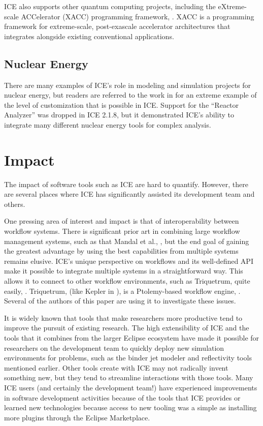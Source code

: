 ICE also supports other quantum computing projects, including the
eXtreme-scale ACCelerator (XACC) programming framework,
\cite{mccaskey_ornl-qci/xacc_2016}. XACC is a programming framework for
extreme-scale, post-exascale accelerator architectures that integrates
alongside existing conventional applications.

\subsection{Nuclear Energy}\label{nuclear-energy}

There are many examples of ICE's role in modeling and simulation
projects for nuclear energy, but readers are referred to the work in
\cite{billings_domain-specific_2015} for an extreme example of the level of
customization that is possible in ICE. Support for the ``Reactor
Analyzer'' was dropped in ICE 2.1.8, but it demonstrated ICE's ability
to integrate many different nuclear energy tools for complex analysis.

\section{Impact}\label{impact}

The impact of software tools such as ICE are hard to quantify. However,
there are several places where ICE has significantly assisted its
development team and others.

One pressing area of interest and impact is that of interoperability
between workflow systems. There is significant prior art in combining
large workflow management systems, such as that Mandal et al.,
\cite{mandal_integrating_2007}, but the end goal of gaining the greatest
advantage by using the best capabilities from multiple systems remains elusive.
ICE's unique perspective on workflows and its well-defined API make it
possible to integrate multiple systems in a straightforward way. This
allows it to connect to other workflow environments, such as Triquetrum,
quite easily, \cite{brooks_introducing_2016}. Triquetrum, (like Kepler in
\cite{mandal_integrating_2007}), is a Ptolemy-based workflow engine,
\cite{brooks_triquetrum:_2015}. Several of the authors of this paper are using
it to investigate these issues.

It is widely known that tools that make researchers more productive tend
to improve the pursuit of existing research. The high extensibility of
ICE and the tools that it combines from the larger Eclipse ecosystem
have made it possible for researchers on the development team to quickly
deploy new simulation environments for problems, such as the binder jet
modeler and reflectivity tools mentioned earlier. Other tools create
with ICE may not radically invent something new, but they tend to
streamline interactions with those tools. Many ICE users (and certainly
the development team!) have experienced improvements in software
development activities because of the tools that ICE provides or learned
new technologies because access to new tooling was a simple as
installing more plugins through the Eclipse Marketplace.

